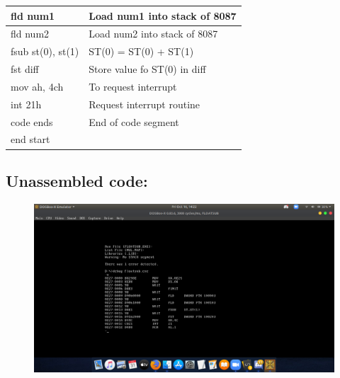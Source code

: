 \documentclass[10pt,a4paper]{article}
\begin{document}
\begin{flushleft}
\begin{table}[htb]
{\begin{tabular}{|l|l|}
\hline
fld num1                                                         & Load num1 into stack of 8087                  \\
\hline
fld num2                                                         & Load num2 into stack of 8087                  \\
\hline
fsub st(0), st(1)                                                & ST(0) = ST(0) + ST(1)                         \\
\hline
fst diff                                                         & Store value fo ST(0) in diff                  \\
\hline
mov ah, 4ch                                                      & To request interrupt                          \\
\hline
int 21h                                                          & Request interrupt routine                     \\ 
\hline
code ends                                                        & End of code segment                           \\
\hline
end start                                                        &                                               \\
\hline
\end{tabular}
}
\end{table}

\newpage
\subsection*{\textbf{Unassembled code:}}
\begin{figure}[h]
    \centering
    \includegraphics[trim = 100mm 60mm 200mm 110mm, clip, width = \textwidth]{Pics/FSUS.png}
\end{figure}

\end{flushleft}
\end{document}

